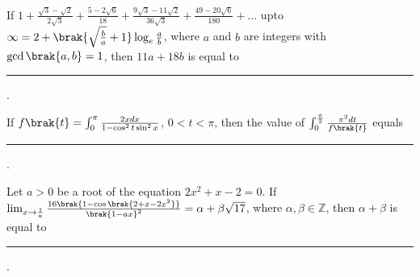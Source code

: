\hfill{}

\item If $1+\frac{\sqrt{3}-\sqrt{2}}{2\sqrt{3}}+\frac{5-2\sqrt{6}}{18}+\frac{9\sqrt{3}-11\sqrt{2}}{36\sqrt{3}}+\frac{49-20\sqrt{6}}{180}+\dots$ upto $\infty=2+\brak{\sqrt{\frac{b}{a}}+1}\log_e{\frac{a}{b}}$, where $a$ and $b$ are integers with $\gcd\brak{a,b}=1$, then $11a+18b$ is equal to \rule{1cm}{0.15mm}. 

\hfill{}

\item If $f\brak{t}=\int_{0}^{\pi}\frac{2xdx}{1-\cos^{2}t\sin^{2}x}$, $0<t<\pi$, then the value of $\int_{0}^{\frac{\pi}{2}}\frac{\pi^{2}dt}{f\brak{t}}$ equals \rule{1cm}{0.15mm}.

\hfill{}

\item Let $a>0$ be a root of the equation $2x^2+x-2=0$. If $\lim_{x\to\frac{1}{a}}\frac{16\brak{1-\cos\brak{2+x-2x^2}}}{\brak{1-ax}^2}=\alpha+\beta\sqrt{17}$, where $\alpha,\beta\in\mathbb{Z}$, then $\alpha+\beta$ is equal to \rule{1cm}{0.15mm}.

\hfill{}
